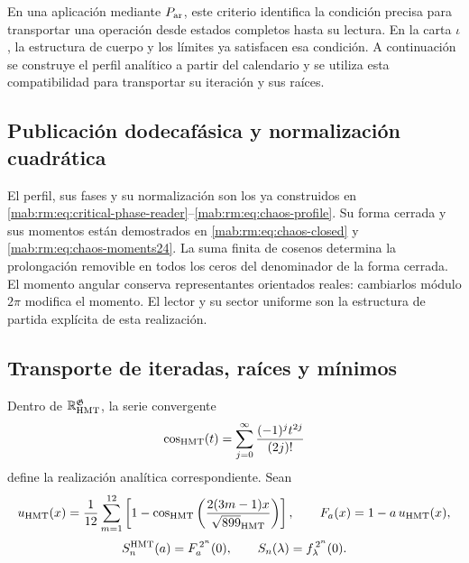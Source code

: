 En una aplicación mediante \(P_{\rm ar}\), este criterio identifica la
condición precisa para transportar una operación desde estados completos
hasta su lectura. En la carta \(\iota\), la estructura de cuerpo y
los límites ya satisfacen esa condición. A continuación se construye
el perfil analítico a partir del calendario y se utiliza esta
compatibilidad para transportar su iteración y sus raíces.

\subsection{Publicación dodecafásica y normalización cuadrática}
\label{hmtfg:perfil-dodecafasico}

El perfil, sus fases y su normalización son los ya construidos en \eqref{mab:rm:eq:critical-phase-reader}--\eqref{mab:rm:eq:chaos-profile}. Su forma cerrada y sus momentos están demostrados en \eqref{mab:rm:eq:chaos-closed} y \eqref{mab:rm:eq:chaos-moments24}. La suma finita de cosenos determina la prolongación removible en todos los ceros del denominador de la forma cerrada. El momento angular conserva representantes orientados reales: cambiarlos módulo $2\pi$ modifica el momento. El lector y su sector uniforme son la estructura de partida explícita de esta realización.

\subsection{Transporte de iteradas, raíces y mínimos}
\label{hmtfg:transporte-raices}

Dentro de \(\mathbb R_{\rm HMT}^{\mathfrak G}\), la serie convergente
\[
 \cos_{\rm HMT}(t)=\sum_{j=0}^{\infty}
                   \frac{(-1)^j t^{2j}}{(2j)!}
\]
define la realización analítica correspondiente. Sean
\[
 u_{\rm HMT}(x)=\frac1{12}\sum_{m=1}^{12}
  \left[1-\cos_{\rm HMT}
   \left(\frac{2(3m-1)x}{\sqrt{899}_{\rm HMT}}\right)\right],
 \qquad F_a(x)=1-a\,u_{\rm HMT}(x),
\]
\[
 S_n^{\rm HMT}(a)=F_a^{\,2^n}(0),\qquad
 S_n(\lambda)=f_\lambda^{\,2^n}(0).
\]

